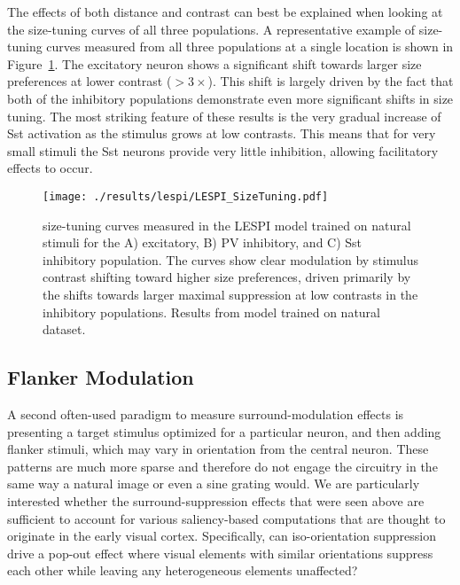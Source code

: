 The effects of both distance and contrast can best be
explained when looking at the size-tuning curves of all three
populations. A representative example of size-tuning curves measured
from all three populations at a single location is shown in
Figure~\ref{LESPI_SizeTuning}. The excitatory neuron shows a
significant shift towards larger size preferences at lower contrast
($>3\times$). This shift is largely driven by the fact that both of
the inhibitory populations demonstrate even more significant shifts in size
tuning. The most striking feature of these results is the very gradual increase
of Sst activation as the stimulus grows at low contrasts. This means
that for very small stimuli the Sst neurons provide very little
inhibition, allowing facilitatory effects to occur.

\begin{figure}
	\centering
        \texttt{[image: ./results/lespi/LESPI\_SizeTuning.pdf]}
	\caption[size-tuning curves of the excitatory, PV, and Sst
      population at various contrasts.]{size-tuning curves measured in
      the LESPI model trained on natural stimuli for the A)
      excitatory, B) PV inhibitory, and C) Sst inhibitory
      population. The curves show clear modulation by stimulus
      contrast shifting toward higher size preferences, driven
      primarily by the shifts towards larger maximal suppression at
      low contrasts in the inhibitory populations. Results from model
      trained on natural dataset.}
	\label{LESPI_SizeTuning}
\end{figure}

\subsection{Flanker Modulation}

A second often-used paradigm to measure surround-modulation effects is
presenting a target stimulus optimized for a particular neuron, and
then adding flanker stimuli, which may vary in orientation from the
central neuron. These patterns are much more sparse and therefore do
not engage the circuitry in the same way a natural image or
even a sine grating would. We are particularly interested
whether the surround-suppression effects that were seen above are
sufficient to account for various saliency-based computations that are
thought to originate in the early visual cortex. Specifically, can
iso-orientation suppression drive a pop-out effect where visual
elements with similar orientations suppress each other while
leaving any heterogeneous elements unaffected?

